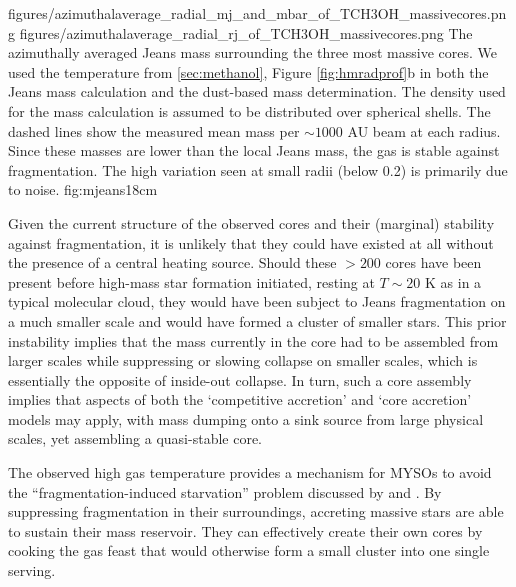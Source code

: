 \documentclass{emulateapj}
\begin{document}

\FigureTwo
{figures/azimuthalaverage_radial_mj_and_mbar_of_TCH3OH_massivecores.png}
{figures/azimuthalaverage_radial_rj_of_TCH3OH_massivecores.png}
{The azimuthally averaged Jeans mass surrounding the
three most massive cores.  We used the \methanol temperature from
\ref{sec:methanol}, Figure \ref{fig:hmradprof}b in both the Jeans mass
calculation and the dust-based mass determination.
The density used for the mass calculation is assumed to be distributed
over spherical shells.  The dashed lines show the measured mean mass per
$\sim1000$ AU beam at each radius.  Since these masses are lower than
the local Jeans mass, the gas is stable against fragmentation.
The high variation seen at small radii (below 0.2\arcsec) is primarily due
to noise.
}
{fig:mjeans}{1}{8cm}



Given the current structure of the observed cores and their (marginal) stability
against fragmentation, it is unlikely that they could have existed at
all without the presence of a central heating source.  Should these $>200$
\msun cores have been present before high-mass star formation initiated,
resting at $T\sim20$ K as in a typical molecular cloud, they would have been
subject to Jeans fragmentation on a much smaller scale and would have formed a
cluster of smaller stars.  This prior instability implies that the mass
currently in the core had
to be assembled from larger scales while suppressing or slowing collapse on
smaller scales, which is essentially the opposite of inside-out collapse.
In turn, such a core assembly implies that aspects of both the `competitive accretion'
and `core accretion' models may apply, with mass dumping onto a sink source from large
physical scales, yet assembling a quasi-stable core.

The observed high gas temperature provides a mechanism for MYSOs to avoid the
``fragmentation-induced starvation'' problem discussed by
\citet{Peters2010a,Peters2010c} and \citet{Girichidis2012b}.  By suppressing
fragmentation in their surroundings, accreting massive stars are able to
sustain their mass reservoir.  They can effectively create their own cores by
cooking the gas feast that would otherwise form a small cluster into one single
serving.
\end{document}
